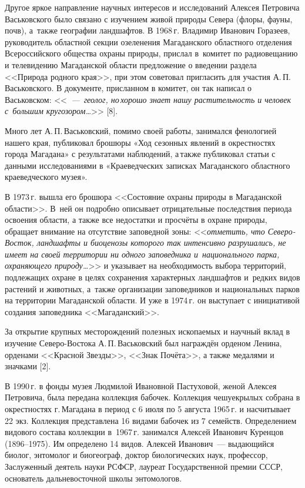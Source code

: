 Другое яркое направление научных интересов и исследований Алексея Петровича Васьковского было связано с изучением живой природы Севера (флоры, фауны, почв), а~также географии ландшафтов. В 1968\,г. Владимир Иванович Горазеев, руководитель областной секции озеленения Магаданского областного отделения Всероссийского общества охраны природы, прислал в~комитет по радиовещанию и телевидению Магаданской области предложение о введении раздела <<Природа родного края>>, при этом советовал пригласить для участия А.\,П.\,Васьковского. В документе, присланном в комитет, он так написал о Васьковском: <<\textit{\mbox{~--- геолог,} но\,хорошо знает нашу растительность и человек с~большим кругозором\dots}>> [8].

Много лет А.\,П.\,Васьковский, помимо своей работы, занимался фенологией нашего края, публиковал брошюры «Ход сезонных явлений в окрестностях города Магадана» с результатами наблюдений, а\,также публиковал статьи с данными исследованиями в «Краеведческих записках Магаданского областного краеведческого музея».

В 1973\,г. вышла его брошюра <<Состояние охраны природы в Магаданской области>>. В~ней он подробно описывает отрицательные последствия периода освоения области, а также все недостатки и просчёты в охране природы, обращает внимание на отсутствие заповедной зоны: <<\textit{ отметить, что Северо-Восток, ландшафты и биоценозы которого так интенсивно разрушались, не имеет на своей территории ни одного заповедника и~национального парка, охраняющего природу\dots}>> и указывает на необходимость выбора территорий, подлежащих охране в целях сохранения характерных ландшафтов и~редких видов растений и животных, а~также организации заповедников и национальных парков на территории Магаданской области. И уже в 1974\,г. он выступает с инициативой создания заповедника <<Магаданский>>.

За открытие крупных месторождений полезных ископаемых и научный вклад в изучение Северо-Востока А.\,П.\,Васьковский был награждён орденом Ленина, орденами <<Красной Звезды>>, <<Знак Почёта>>, а также медалями и значками [2].

В 1990\,г. в фонды музея Людмилой Ивановной Пастуховой, женой Алексея Петровича, была передана коллекция бабочек. Коллекция чешуекрылых собрана в окрестностях г.\,Магадана в период с 6 июля по 5 августа 1965\,г. и насчитывает 22 экз. Коллекция представлена 16 видами бабочек из 7 семейств. Определением видового состава коллекции в~1967\,г. занимался Алексей Иванович Куренцов (1896--1975). Им определено 14 видов.
Алексей Иванович~--- выдающийся биолог, энтомолог и биогеограф, доктор биологических наук, профессор, Заслуженный деятель науки РСФСР, лауреат Государственной премии СССР, основатель дальневосточной школы энтомологов.

